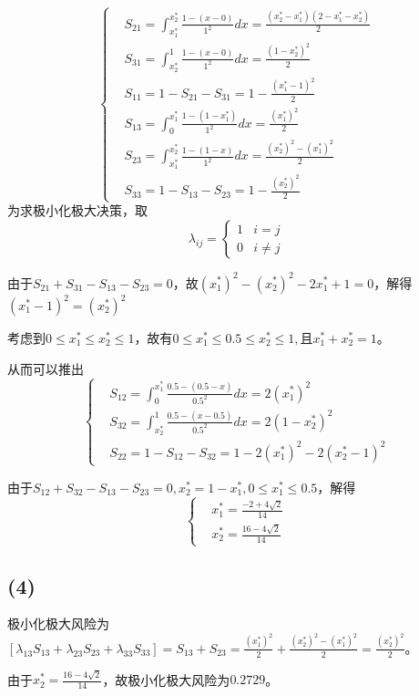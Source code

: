 \documentclass{ctexart}
\begin{document}
\[
\begin{cases}
&S_{21}=\int_{x_1^*}^{x_2^*}\frac{1-(x-0)}{1^2}dx=\frac{(x_2^*-x_1^*)(2-x_1^*-x_2^*)}{2}\\
&S_{31}=\int_{x_2^*}^1\frac{1-(x-0)}{1^2}dx=\frac{(1-x_2^*)^2}{2}\\
&S_{11}=1-S_{21}-S_{31}=1-\frac{(x_1^*-1)^2}{2}\\
&S_{13}=\int_0^{x_1^*}\frac{1-(1-x_1^*)}{1^2}dx=\frac{(x_1^*)^2}{2}\\
&S_{23}=\int_{x_1^*}^{x_2^*}\frac{1-(1-x)}{1^2}dx=\frac{(x_2^*)^2-(x_1^*)^2}{2}\\
&S_{33}=1-S_{13}-S_{23}=1-\frac{(x_2^*)^2}{2}
\end{cases}
\]
为求极小化极大决策，取
\[
\lambda_{ij}=
\begin{cases}
1 & i=j \\
0 & i \neq j
\end{cases}
\]

由于$S_{21}+S_{31}-S_{13}-S_{23}=0$，故$(x_1^*)^2-(x_2^*)^2-2x_1^*+1=0$，解得$(x_1^*-1)^2=(x_2^*)^2$

考虑到$0 \le x_1^* \le x_2^* \le 1$，故有$0 \le x_1^* \le 0.5 \le x_2^* \le 1,\textrm{且} x_1^*+x_2^*=1$。

从而可以推出
\[
\begin{cases}
&S_{12}=\int_0^{x_1^*}\frac{0.5-(0.5-x)}{0.5^2}dx=2(x_1^*)^2\\
&S_{32}=\int_{x_2^*}^1\frac{0.5-(x-0.5)}{0.5^2}dx=2(1-x_2^*)^2\\
&S_{22}=1-S_{12}-S_{32}=1-2(x_1^*)^2-2(x_2^*-1)^2
\end{cases}
\]

由于$S_{12}+S_{32}-S_{13}-S_{23}=0,x_2^*=1-x_1^*,0 \le x_1^* \le 0.5$，解得
\[
\begin{cases}
& x_1^*=\frac{-2+4\sqrt{2}}{14} \\
& x_2^*=\frac{16-4\sqrt{2}}{14}
\end{cases}
\]
\subsection*{(4)}
极小化极大风险为$[\lambda_{13}S_{13}+\lambda_{23}S_{23}+\lambda_{33}S_{33}]=S_{13}+S_{23}=\frac{(x_1^*)^2}{2}+\frac{(x_2^*)^2-(x_1^*)^2}{2}=\frac{(x_2^*)^2}{2}$。

由于$x_2^*=\frac{16-4\sqrt{2}}{14}$，故极小化极大风险为$0.2729$。
\end{document}
